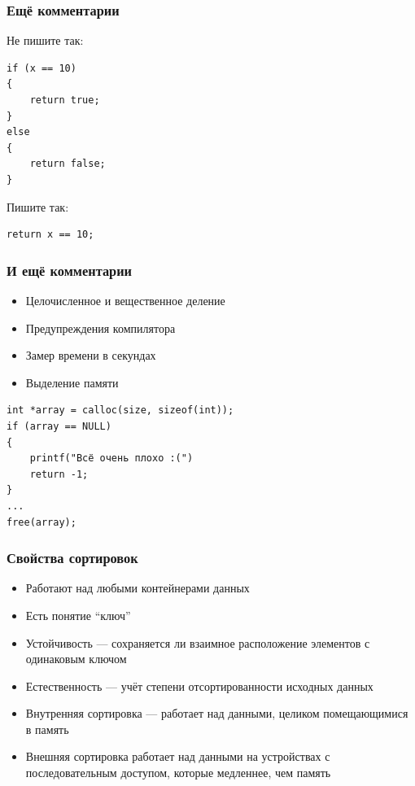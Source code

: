 \documentclass[xetex,mathserif,serif]{beamer}
\begin{document}
    \begin{frame}[fragile]
        \frametitle{Ещё комментарии}
        Не пишите так:
        \begin{verbatim}
if (x == 10) 
{
    return true;
}
else
{
    return false;
}
        \end{verbatim}
        Пишите так:
        \begin{verbatim}
return x == 10;
        \end{verbatim}
    \end{frame}

    \begin{frame}[fragile]
        \frametitle{И ещё комментарии}
        \begin{itemize}
            \item Целочисленное и вещественное деление
            \item Предупреждения компилятора
            \item Замер времени в секундах
            \item Выделение памяти
        \end{itemize}
        \begin{verbatim}
int *array = calloc(size, sizeof(int));
if (array == NULL) 
{
    printf("Всё очень плохо :(")
    return -1;
}
...
free(array);
        \end{verbatim}
    \end{frame}
    
    \begin{frame}
        \frametitle{Свойства сортировок}
        \begin{itemize}
            \item Работают над любыми контейнерами данных
            \item Есть понятие ``ключ''
            \item Устойчивость --- сохраняется ли взаимное расположение элементов с одинаковым ключом
            \item Естественность --- учёт степени отсортированности исходных данных
            \item Внутренняя сортировка --- работает над данными, целиком помещающимися в память
            \item Внешняя сортировка работает над данными на устройствах с последовательным доступом, которые медленнее, чем память
        \end{itemize}
    \end{frame}
\end{document}
